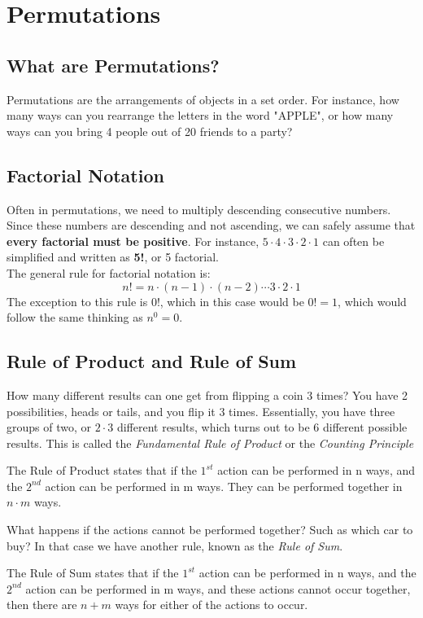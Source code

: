 \section{Permutations}

    \subsection{What are Permutations?}
    Permutations are the arrangements of objects in a set order. 
    For instance, how many ways can you rearrange the letters in the word "APPLE",
    or how many ways can you bring 4 people out of 20 friends to a party?

    \subsection{Factorial Notation}
    Often in permutations, we need to multiply descending consecutive numbers.
    Since these numbers are descending and not ascending, we can safely assume that \textbf{every factorial must be positive}. 
    For instance,  $5\cdot4\cdot3\cdot2\cdot1$ can often be simplified and written as \textbf{5!}, or 5 factorial.\\
    The general rule for factorial notation is: 
    \begin{equation*}%
        n! = n\cdot(n-1)\cdot(n-2)\cdots3\cdot2\cdot1
    \end{equation*}
    The exception to this rule is 0!, which in this case would be $0! = 1$, which would follow the same thinking as $n^0=0$.
    
    \subsection{Rule of Product and Rule of Sum}
    How many different results can one get from flipping a coin 3 times?
    You have 2 possibilities, heads or tails, and you flip it 3 times.
    Essentially, you have three groups of two, or $2\cdot3$ different results, which turns out to be $6$ different possible results.
    This is called the \emph{Fundamental Rule of Product} or the \emph{Counting Principle}
    \begin{definition}
        The Rule of Product states that if the $1^{st}$ action can be performed in n ways, and the $2^{nd}$ action can be performed in m ways.
        They can be performed together in $n\cdot m$ ways. 
    \end{definition}
    What happens if the actions cannot be performed together? Such as which car to buy? In that case we have another rule, known as the \emph{Rule of Sum}.
    \begin{definition}
        The Rule of Sum states that if the $1^{st}$ action can be performed in n ways, and the $2^{nd}$ action can be performed in m ways, and these actions cannot occur together, then there are $n+m$ ways for either of the actions to occur.
    \end{definition}
    
